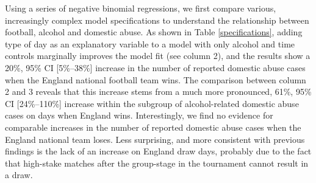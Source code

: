 \documentclass[12pt, letterpaper]{article}
\begin{document}
Using a series of negative binomial regressions, we first compare various, increasingly complex model specifications to understand the relationship between football, alcohol and domestic abuse.  As shown in Table \ref{specifications}, adding type of day as an explanatory variable to a model with only alcohol and time controls marginally improves the model fit (see column 2), and the results show a 20\%, 95\% CI [5\%--38\%] increase in the number of reported domestic abuse cases when the England national football team wins. The comparison between column 2 and 3 reveals that this increase stems from a much more pronounced, 61\%, 95\% CI [24\%--110\%] increase within the subgroup of alcohol-related domestic abuse cases on days when England wins. Interestingly, we find no evidence for comparable increases in the number of reported domestic abuse cases when the England national team loses. Less surprising, and more consistent with previous findings is the lack of an increase on England draw days, probably due to the fact that high-stake matches after the group-stage in the tournament cannot result in a draw. 
\end{document}

